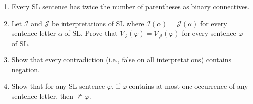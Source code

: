 \documentclass[12pt]{article}
\newcommand{\set}[1]{\lbrace#1\rbrace} %
\newcommand{\I}{\mathcal{I}} %
\newcommand{\J}{\mathcal{J}} %
\newcommand{\V}[1]{\mathcal{V}_{#1}} %
\begin{document}
\begin{enumerate}
  \item Every SL sentence has twice the number of parentheses as binary connectives.


  \item Let $\I$ and $\J$ be interpretations of SL where $\I(\alpha)=\J(\alpha)$ for every sentence letter $\alpha$ of SL.
    Prove that $\V{\I}(\varphi)=\V{\J}(\varphi)$ for every sentence $\varphi$ of SL.

  \item Show that every contradiction (i.e., false on all interpretations) contains negation.

  \item Show that for any SL sentence $\varphi$, if $\varphi$ contains at most one occurrence of any sentence letter, then $\nvDash \varphi$. 

\end{enumerate}
\end{document}
